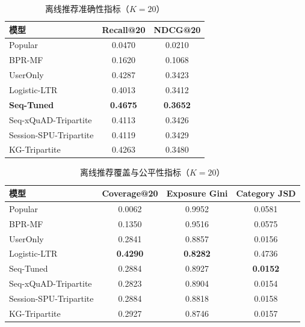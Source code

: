 \documentclass[12pt,a4paper]{article}
\begin{document}
    \begin{table}[htbp]
        \centering
        \caption{离线推荐准确性指标（$K=20$）}
        \label{tab:offline_accuracy}
        \begin{tabular}{lcc}
            \toprule
            \textbf{模型} & \textbf{Recall@20} & \textbf{NDCG@20} \\
            \midrule
            Popular & 0.0470 & 0.0210 \\
            BPR-MF & 0.1620 & 0.1068 \\
            UserOnly & 0.4287 & 0.3423 \\
            Logistic-LTR & 0.4013 & 0.3412 \\
            \textbf{Seq-Tuned} & \textbf{0.4675} & \textbf{0.3652} \\
            Seq-xQuAD-Tripartite & 0.4113 & 0.3426 \\
            Session-SPU-Tripartite & 0.4119 & 0.3429 \\
            KG-Tripartite & 0.4263 & 0.3480 \\
            \bottomrule
        \end{tabular}
    \end{table}

    \begin{table}[htbp]
        \centering
        \caption{离线推荐覆盖与公平性指标（$K=20$）}
        \label{tab:offline_fairness}
        \begin{tabular}{lccc}
            \toprule
            \textbf{模型} & \textbf{Coverage@20} & \textbf{Exposure Gini} & \textbf{Category JSD} \\
            \midrule
            Popular & 0.0062 & 0.9952 & 0.0581 \\
            BPR-MF & 0.1350 & 0.9516 & 0.0575 \\
            UserOnly & 0.2841 & 0.8857 & 0.0156 \\
            Logistic-LTR & \textbf{0.4290} & \textbf{0.8282} & 0.4736 \\
            Seq-Tuned & 0.2884 & 0.8927 & \textbf{0.0152} \\
            Seq-xQuAD-Tripartite & 0.2823 & 0.8904 & 0.0154 \\
            Session-SPU-Tripartite & 0.2884 & 0.8818 & 0.0158 \\
            KG-Tripartite & 0.2927 & 0.8746 & 0.0157 \\
            \bottomrule
        \end{tabular}
    \end{table}
\end{document}
